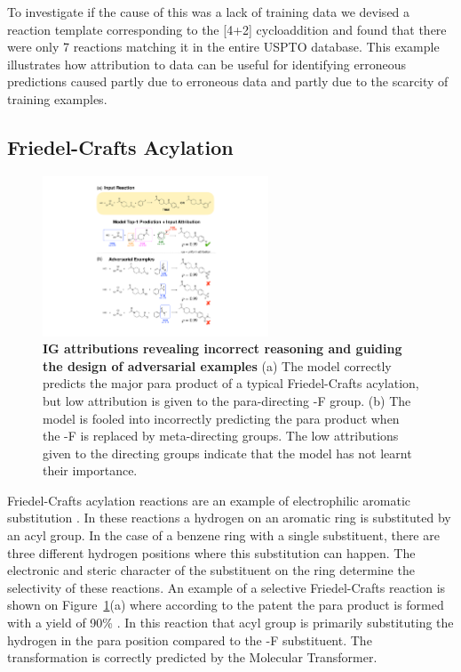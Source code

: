 To investigate if the cause of this was a lack of training data we devised a reaction template corresponding to the [4+2] cycloaddition and found that there were only 7 reactions matching it in the entire USPTO database. This example illustrates how attribution to data can be useful for identifying erroneous predictions caused partly due to erroneous data and partly due to the scarcity of training examples. 

\subsection{Friedel-Crafts Acylation}

\begin{figure}[ht!]
    \centering
    \includegraphics[width=0.6\textwidth]{Chapters/Transformer/Figs/sear.pdf}
    \caption{\label{fig:sear} \textbf{IG attributions revealing incorrect reasoning and guiding the design of adversarial examples} (a) The model correctly predicts the major para product of a typical Friedel-Crafts acylation, but low attribution is given to the para-directing -F group. (b) The model is fooled into incorrectly predicting the para product when the -F is replaced by meta-directing groups. The low attributions given to the directing groups indicate that the model has not learnt their importance.}
\end{figure}

Friedel-Crafts acylation reactions are an example of electrophilic aromatic substitution \cite{Friedel1877}. In these reactions a hydrogen on an aromatic ring is substituted by an acyl group. In the case of a benzene ring with a single substituent, there are three different hydrogen positions where this substitution can happen. The electronic and steric character of the substituent on the ring determine the selectivity of these reactions. An example of a selective Friedel-Crafts reaction is shown on Figure~\ref{fig:sear}(a) where according to the patent the para product is formed with a yield of 90\% \cite{fc_para1981}. In this reaction that acyl group is primarily substituting the hydrogen in the para position compared to the -F substituent. The transformation is correctly predicted by the Molecular Transformer. 

